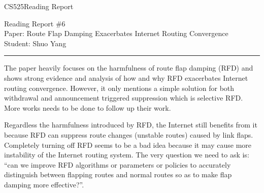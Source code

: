 \documentclass[11pt]{article}
\def\CourseCode{CS525}
\def\ReportNo{6}
\def\Category{Reading Report}
\def\PaperTitle{Route Flap Damping Exacerbates Internet Routing
  Convergence}
\def\Author{Shuo Yang}
\begin{document}
\noindent

\CourseCode \hfill \Category

\begin{center}
Reading Report \#\ReportNo\\
Paper: \PaperTitle\\
Student: \Author\\
\end{center}

\hrule\smallskip
\vspace{1.5em}

The paper heavily focuses on the harmfulness of route flap damping
(RFD) and shows strong evidence and analysis of how and why RFD
exacerbates Internet routing convergence. However, it only mentions a
simple solution for both withdrawal and announcement triggered
suppression which is selective RFD. More works needs to be done to
follow up their work.

\vspace{1em}
Regardless the harmfulness introduced by RFD, the Internet still
benefits from it because RFD can suppress route changes (unstable
routes) caused by link flaps. Completely turning off RFD seems to be a
bad idea because it may cause more instability of the Internet routing
system. The very question we need to ask is: ``can we improve RFD
algorithms or parameters or policies to accurately distinguish between
flapping routes and normal routes so as to make flap damping more
effective?''. 
\end{document}
